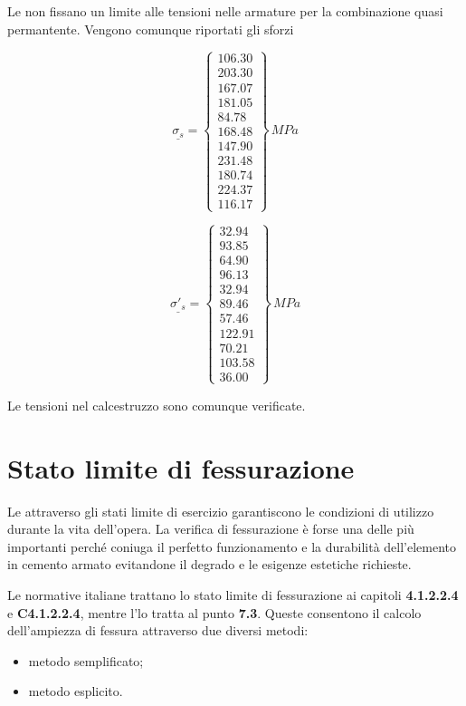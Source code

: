 Le \ntc non fissano un limite alle tensioni nelle armature per la combinazione quasi permantente. Vengono comunque riportati gli sforzi

\[
\underline{\sigma_s} = 
\begin{Bmatrix}
	106.30\\
	203.30\\
	167.07\\
	181.05\\
	84.78\\
	168.48\\
	147.90\\
	231.48\\
	180.74\\
	224.37\\
	116.17
\end{Bmatrix}\,MPa
\]

\[
\underline{\sigma'_s} = 
\begin{Bmatrix}
	32.94\\
	93.85\\
	64.90\\
	96.13\\
	32.94\\
	89.46\\
	57.46\\
	122.91\\
	70.21\\
	103.58\\
	36.00
\end{Bmatrix}\,MPa
\]

Le tensioni nel calcestruzzo sono comunque verificate.

\section{Stato limite di fessurazione}\label{sec:SLE_fessurazione}
Le \ntc attraverso gli stati limite di esercizio garantiscono le condizioni di utilizzo durante la vita dell'opera. La verifica di fessurazione è forse una delle più importanti perché coniuga il perfetto funzionamento e la durabilità dell'elemento in cemento armato evitandone il degrado e le esigenze estetiche richieste.

Le normative italiane trattano lo stato limite di fessurazione ai capitoli \textbf{4.1.2.2.4} e \textbf{C4.1.2.2.4}, mentre l'\ec lo tratta al punto \textbf{7.3}. Queste consentono il calcolo dell'ampiezza di fessura attraverso due diversi metodi:
\begin{itemize}
    \item metodo semplificato;
    \item metodo esplicito.
\end{itemize}

